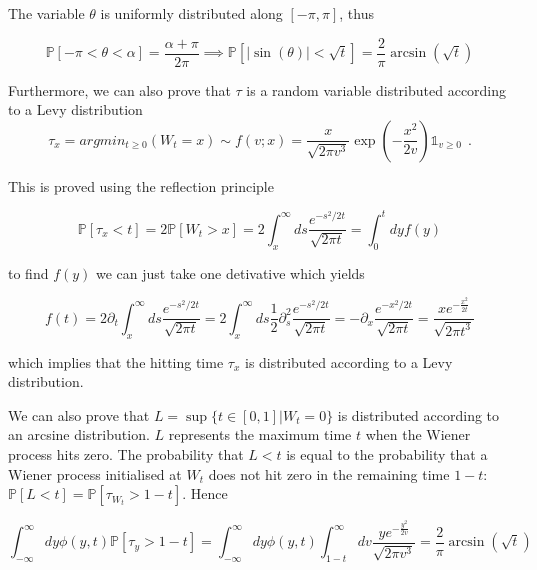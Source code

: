 \documentclass[11pt,a4paper]{article}
\begin{document}
The variable $\theta$ is uniformly distributed along $[-\pi,\pi]$, thus 

\begin{equation}
    \mathbb{P}[-\pi<\theta <\alpha] = \frac{\alpha+\pi}{2\pi} \implies \mathbb{P}[|\sin(\theta)| <\sqrt{t}] = \frac{2}{\pi} \arcsin(\sqrt{t})
\end{equation}


Furthermore, we can also prove that $\tau$ is a random variable distributed according to a Levy distribution
\begin{equation}
    \tau_x = argmin_{t \geq 0}(W_t = x) \sim  f(v; x) =  \frac{x}{\sqrt{2 \pi v^3}}\exp(-\frac{x^2}{2v})\mathds{1}_{v\geq 0} \hspace{5pt}.
\end{equation}

This is proved using the reflection principle

\begin{equation}
    \mathbb{P}[\tau_x<t] = 2 \mathbb{P}[W_t>x] = 2 \int_{x}^{\infty}ds \frac{e^{-s^2/2t}}{\sqrt{2\pi t}} = \int_{0}^{t}dyf(y)
\end{equation}

to find $f(y)$ we can just take one detivative which yields

\begin{equation}
f(t) = 2 \partial_t  \int_{x}^{\infty}ds \frac{e^{-s^2/2t}}{\sqrt{2\pi t}} = 2 \int_{x}^{\infty}ds \frac{1}{2}\partial^2_{s}\frac{e^{-s^2/2t}}{\sqrt{2\pi t}} = -\partial_{x}\frac{e^{-x^2/2t}}{\sqrt{2\pi t}} = \frac{x e^{-\frac{x^2}{2t}}}{\sqrt{2\pi t^3}}
\end{equation}

which implies that the hitting time $\tau_x$ is distributed according to a Levy distribution.

We can also prove that $L = \sup\{t \in [0,1]| W_t = 0\}$ is distributed according to an arcsine distribution. $L$ represents the maximum time $t$ when the Wiener process hits zero. The probability that $L<t$ is equal to the probability that a Wiener process initialised at $W_t$ does not hit zero in the remaining time $1-t$: $\mathbb{P}[L<t] = \mathbb{P}[\tau_{W_t}>1-t]$. Hence

\begin{equation}
    \int_{-\infty}^{\infty}dy \phi(y,t) \mathbb{P}[\tau_y>1-t] = \int_{-\infty}^{\infty}dy \phi(y,t)\int_{1-t}^{\infty} dv \frac{y e^{-\frac{y^2}{2v}}}{\sqrt{2\pi v^3}} = \frac{2}{\pi}\arcsin(\sqrt{t})
\end{equation}
\end{document}

